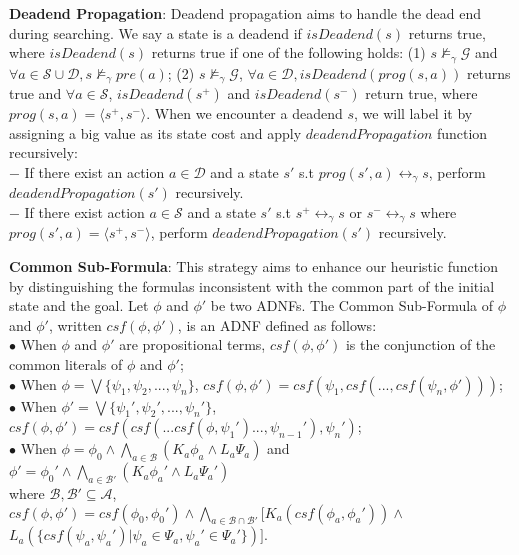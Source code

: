 \documentclass{llncs}
\begin{document}
\textbf{Deadend Propagation}: Deadend propagation aims to handle the dead end during searching. We say a state is a deadend if $isDeadend(s)$ returns true, where $isDeadend(s)$ returns true if one of the following holds: (1) $s\not\models_\gamma\mathcal{G}$ and $\forall a\in\mathcal{S}\cup\mathcal{D}, s\not\models_\gamma pre(a)$; (2) $s\not\models_\gamma\mathcal{G}$, $\forall a\in\mathcal{D}, isDeadend(prog(s,a))$ returns true and $\forall a\in\mathcal{S}$, $isDeadend(s^+)$ and $isDeadend(s^-)$ return true, where $prog(s,a)=\langle s^+, s^- \rangle$. When we encounter a deadend $s$, we will label it by assigning a big value as its state cost and apply $deadendPropagation$ function recursively:\\
\hspace*{0.05in}$-$ If there exist an action $a\in\mathcal{D}$ and a state $s'$ s.t $prog(s',a)\leftrightarrow_\gamma s$, perform\\
\hspace*{0.05in}\quad $deadendPropagation(s')$ recursively.\\
\hspace*{0.05in}$-$ If there exist action $a\in\mathcal{S}$ and a state $s'$ s.t $s^+ \leftrightarrow_\gamma s$ or $s^- \leftrightarrow_\gamma s$ where\\
\hspace*{0.05in}\quad $prog(s',a) = \langle s^+, s^- \rangle$, perform $deadendPropagation(s')$ recursively.

\textbf{Common Sub-Formula}: This strategy aims to enhance our heuristic function by distinguishing the formulas inconsistent with the common part of the initial state and the goal.  Let $\phi$ and $\phi'$ be two ADNFs. The Common Sub-Formula of $\phi$ and $\phi'$, written $csf(\phi, \phi')$, is an ADNF defined as follows:\\
      $\bullet$ When $\phi$ and $\phi'$ are propositional terms, $csf(\phi,\phi')$ is the conjunction of the \\ \hspace*{0.1in}common literals of $\phi$ and $\phi'$;\\
      $\bullet$ When $\phi=\bigvee\{\psi_1,\psi_2,...,\psi_n\}$, $csf(\phi,\phi')=csf(\psi_1, csf(..., csf(\psi_n, \phi')))$;\\
      $\bullet$ When $\phi'=\bigvee\{\psi_1',\psi_2',...,\psi_n'\}$, $csf(\phi,\phi')=csf(csf(...csf(\phi,\psi_1')..., \psi_{n-1}'), \psi_n')$;\\
      $\bullet$ When $\phi=\phi_0\land\bigwedge_{a\in\mathcal{B}}(K_a\phi_a\land L_a\Psi_a)$ and $\phi'=\phi_0'\land\bigwedge_{a\in\mathcal{B}'}(K_a\phi_a'\land L_a\Psi_a')$ \\ \hspace*{0.1in}where $\mathcal{B},\mathcal{B}'\subseteq\mathcal{A}$,  $csf(\phi,\phi')=csf(\phi_0,\phi_0')\land\bigwedge_{a\in\mathcal{B}\cap\mathcal{B}'}[K_a(csf(\phi_a,\phi_a'))\land $\\ \hspace*{0.1in}$L_a(\{csf(\psi_a, \psi_a')|\psi_a\in\Psi_a, \psi_a'\in\Psi_a'\})]$.
\end{document}
